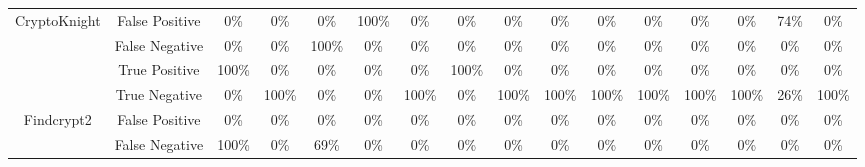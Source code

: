 \begin{table}[htb]
\begin{adjustbox}{max width=\textwidth}
\begin{tabular}{cc|ccccccccc|ccccc}
\multicolumn{1}{c|}{\multirow{4}{*}{CryptoKnight}} & \multicolumn{1}{c||}{False Positive} & \multicolumn{1}{c|}{0\%} & \multicolumn{1}{c|}{0\%} & \multicolumn{1}{c|}{0\%} & \multicolumn{1}{c|}{100\%} & \multicolumn{1}{c|}{0\%} & \multicolumn{1}{c|}{0\%} & \multicolumn{1}{c|}{0\%} & \multicolumn{1}{c|}{0\%} & \multicolumn{1}{c|}{0\%} & \multicolumn{1}{c|}{0\%} & \multicolumn{1}{c|}{0\%} & \multicolumn{1}{c|}{0\%} & \multicolumn{1}{c|}{74\%} & 0\% \\ \cline{2-16} 
\multicolumn{1}{c|}{} & \multicolumn{1}{c||}{False Negative} & \multicolumn{1}{c|}{0\%} & \multicolumn{1}{c|}{0\%} & \multicolumn{1}{c|}{100\%} & \multicolumn{1}{c|}{0\%} & \multicolumn{1}{c|}{0\%} & \multicolumn{1}{c|}{0\%} & \multicolumn{1}{c|}{0\%} & \multicolumn{1}{c|}{0\%} & \multicolumn{1}{c|}{0\%} & \multicolumn{1}{c|}{0\%} & \multicolumn{1}{c|}{0\%} & \multicolumn{1}{c|}{0\%} & \multicolumn{1}{c|}{0\%} & 0\% \\ \cline{2-16} 
\multicolumn{1}{c|}{} & \multicolumn{1}{c||}{True Positive} & \multicolumn{1}{c|}{100\%} & \multicolumn{1}{c|}{0\%} & \multicolumn{1}{c|}{0\%} & \multicolumn{1}{c|}{0\%} & \multicolumn{1}{c|}{0\%} & \multicolumn{1}{c|}{100\%} & \multicolumn{1}{c|}{0\%} & \multicolumn{1}{c|}{0\%} & \multicolumn{1}{c|}{0\%} & \multicolumn{1}{c|}{0\%} & \multicolumn{1}{c|}{0\%} & \multicolumn{1}{c|}{0\%} & \multicolumn{1}{c|}{0\%} & 0\% \\ \cline{2-16} 
\multicolumn{1}{c|}{} & \multicolumn{1}{c||}{True Negative} & \multicolumn{1}{c|}{0\%} & \multicolumn{1}{c|}{100\%} & \multicolumn{1}{c|}{0\%} & \multicolumn{1}{c|}{0\%} & \multicolumn{1}{c|}{100\%} & \multicolumn{1}{c|}{0\%} & \multicolumn{1}{c|}{100\%} & \multicolumn{1}{c|}{100\%} & \multicolumn{1}{c|}{100\%} & \multicolumn{1}{c|}{100\%} & \multicolumn{1}{c|}{100\%} & \multicolumn{1}{c|}{100\%} & \multicolumn{1}{c|}{26\%} & 100\% \\ \hline
\multicolumn{1}{c|}{\multirow{4}{*}{Findcrypt2}} & \multicolumn{1}{c||}{False Positive} & \multicolumn{1}{c|}{0\%} & \multicolumn{1}{c|}{0\%} & \multicolumn{1}{c|}{0\%} & \multicolumn{1}{c|}{0\%} & \multicolumn{1}{c|}{0\%} & \multicolumn{1}{c|}{0\%} & \multicolumn{1}{c|}{0\%} & \multicolumn{1}{c|}{0\%} & \multicolumn{1}{c|}{0\%} & \multicolumn{1}{c|}{0\%} & \multicolumn{1}{c|}{0\%} & \multicolumn{1}{c|}{0\%} & \multicolumn{1}{c|}{0\%} & 0\% \\ \cline{2-16} 
\multicolumn{1}{c|}{} & \multicolumn{1}{c||}{False Negative} & \multicolumn{1}{c|}{100\%} & \multicolumn{1}{c|}{0\%} & \multicolumn{1}{c|}{69\%} & \multicolumn{1}{c|}{0\%} & \multicolumn{1}{c|}{0\%} & \multicolumn{1}{c|}{0\%} & \multicolumn{1}{c|}{0\%} & \multicolumn{1}{c|}{0\%} & \multicolumn{1}{c|}{0\%} & \multicolumn{1}{c|}{0\%} & \multicolumn{1}{c|}{0\%} & \multicolumn{1}{c|}{0\%} & \multicolumn{1}{c|}{0\%} & 0\% \\ \cline{2-16} 

\end{tabular}
\end{adjustbox}
\end{table}
